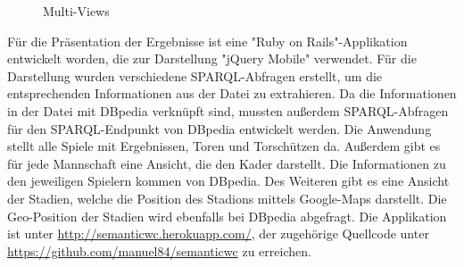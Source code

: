 \documentclass[runningheads,a4paper]{llncs}
\begin{document}
\begin{figure}
\centering
{} 
\caption{Multi-Views}
\label{fig:screenshots}
\end{figure}

Für die Präsentation der Ergebnisse ist eine "Ruby on Rails"{}-Applikation entwickelt worden, die zur Darstellung "jQuery Mobile" verwendet. Für die Darstellung wurden verschiedene SPARQL-Abfragen erstellt, um die entsprechenden Informationen aus der Datei zu extrahieren. Da die Informationen in der Datei mit DBpedia verknüpft sind, mussten außerdem SPARQL-Abfragen für den SPARQL-Endpunkt von DBpedia entwickelt werden. Die Anwendung stellt alle Spiele mit Ergebnissen, Toren und Torschützen da. Außerdem gibt es für jede Mannschaft eine Ansicht, die den Kader darstellt. Die Informationen zu den jeweiligen Spielern kommen von DBpedia. Des Weiteren gibt es eine Ansicht der Stadien, welche die Position des Stadions mittels Google-Maps darstellt. Die Geo-Position der Stadien wird ebenfalls bei DBpedia abgefragt. Die Applikation ist unter \url{http://semanticwc.herokuapp.com/}, der zugehörige Quellcode unter \url{https://github.com/manuel84/semanticwc} zu erreichen.
\end{document}
